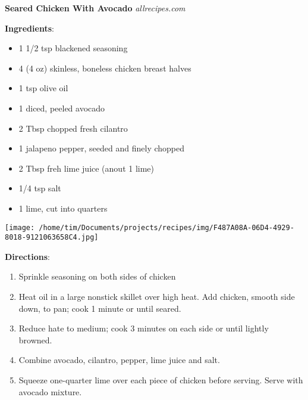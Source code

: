 \documentclass[11pt, twoside, openany]{book}
\begin{document}
\noindent\begin{minipage}[t]{\linewidth}%
{\Large\textbf{Seared Chicken With Avocado}} \label{seared-chicken-with-avocado}\hfill\textit{allrecipes.com}\\
\noindent\begin{minipage}[t]{0.78\linewidth}%
\textbf{Ingredients}:\vspace{-3mm}
\begin{multicols}{2}
\begin{itemize}\setlength\itemsep{-1mm}
\item 1 1/2 tsp blackened seasoning
\item 4 (4 oz) skinless, boneless chicken breast halves
\item 1 tsp olive oil
\item 1 diced, peeled avocado
\item 2 Tbsp chopped fresh cilantro
\item 1 jalapeno pepper, seeded and finely chopped
\item 2 Tbsp freh lime juice (anout 1 lime)
\item 1/4 tsp salt
\item 1 lime, cut into quarters
\end{itemize}
\end{multicols}
\end{minipage}
\noindent\begin{minipage}[t]{0.18\linewidth}
\centering \strut\vspace*{-\baselineskip}\newline
\texttt{[image: /home/tim/Documents/projects/recipes/img/F487A08A-06D4-4929-8018-9121063658C4.jpg]}\\
\end{minipage}\vspace{3mm}
\textbf{Directions}:
\vspace{-3mm}\begin{enumerate}\setlength\itemsep{-1mm}
\item Sprinkle seasoning on both sides of chicken
\item Heat oil in a large nonstick skillet over high heat. Add chicken, smooth side down, to pan; cook 1 minute or until seared.
\item Reduce hate to medium; cook 3 minutes on each side or until lightly browned.
\item Combine avocado, cilantro, pepper, lime juice and salt.
\item Squeeze one-quarter lime over each piece of chicken before serving. Serve with avocado mixture.
\end{enumerate}
\end{minipage}\vspace{8mm}
\end{document}
